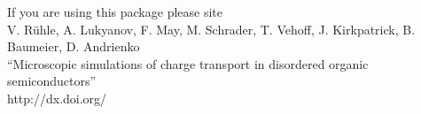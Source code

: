 \begin{titlepage}


\vspace*{1cm}

\vspace*{3cm}
\vspace*{1cm}

\vfill
{\small%
If you are using this package please site \\
\vspace*{0.1cm}
V. R\"uhle, A. Lukyanov, F. May, M. Schrader, T. Vehoff, J. Kirkpatrick, B. Baumeier, D. Andrienko \\
``Microscopic simulations of charge transport in disordered organic semiconductors'' \\
{http://dx.doi.org/} 
}

\vspace*{1.4cm}
\center{\large{\today}}




\end{titlepage}
